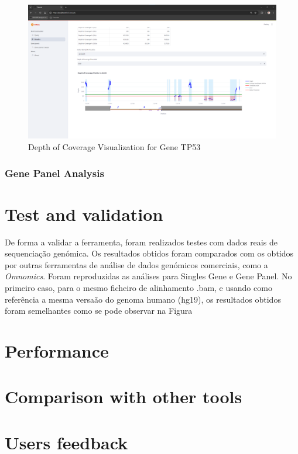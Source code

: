 \begin{itemize}
    \begin{figure}[H]
        \centering
        \includegraphics[width=\textwidth]{figs/v3.5.png}
        \caption{Depth of Coverage Visualization for Gene TP53}
        \label{fig:coverage_plot}
    \end{figure}
\end{itemize}

\subsubsection{\textbf{Gene Panel Analysis}}



\section{Test and validation}

De forma a validar a ferramenta, foram realizados testes com dados reais de sequenciação genómica. Os resultados obtidos foram comparados com os obtidos por outras ferramentas de análise de dados genómicos comerciais, como a \textit{Omnomics}. Foram reproduzidas as análises para Singles Gene e Gene Panel. 
No primeiro caso, para o mesmo ficheiro de alinhamento .bam, e usando como referência a mesma versaão do genoma humano (hg19), os resultados obtidos foram semelhantes como se pode observar na Figura

\section{Performance}


\section{Comparison with other tools}


\section{Users feedback}






